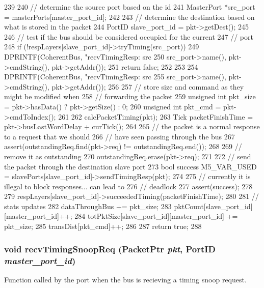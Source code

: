 \begin{DoxyCode}
239 {
240     // determine the source port based on the id
241     MasterPort *src_port = masterPorts[master_port_id];
242 
243     // determine the destination based on what is stored in the packet
244     PortID slave_port_id = pkt->getDest();
245 
246     // test if the bus should be considered occupied for the current
247     // port
248     if (!respLayers[slave_port_id]->tryTiming(src_port)) {
249         DPRINTF(CoherentBus, "recvTimingResp: src %
250                 src_port->name(), pkt->cmdString(), pkt->getAddr());
251         return false;
252     }
253 
254     DPRINTF(CoherentBus, "recvTimingResp: src %
255             src_port->name(), pkt->cmdString(), pkt->getAddr());
256 
257     // store size and command as they might be modified when
258     // forwarding the packet
259     unsigned int pkt_size = pkt->hasData() ? pkt->getSize() : 0;
260     unsigned int pkt_cmd = pkt->cmdToIndex();
261 
262     calcPacketTiming(pkt);
263     Tick packetFinishTime = pkt->busLastWordDelay + curTick();
264 
265     // the packet is a normal response to a request that we should
266     // have seen passing through the bus
267     assert(outstandingReq.find(pkt->req) != outstandingReq.end());
268 
269     // remove it as outstanding
270     outstandingReq.erase(pkt->req);
271 
272     // send the packet through the destination slave port
273     bool success M5_VAR_USED = slavePorts[slave_port_id]->sendTimingResp(pkt);
274 
275     // currently it is illegal to block responses... can lead to
276     // deadlock
277     assert(success);
278 
279     respLayers[slave_port_id]->succeededTiming(packetFinishTime);
280 
281     // stats updates
282     dataThroughBus += pkt_size;
283     pktCount[slave_port_id][master_port_id]++;
284     totPktSize[slave_port_id][master_port_id] += pkt_size;
285     transDist[pkt_cmd]++;
286 
287     return true;
288 }
\end{DoxyCode}
\hypertarget{classCoherentBus_a8a06090652319e21031b8bc2f8018e2b}{
\subsubsection[{recvTimingSnoopReq}]{\setlength{\rightskip}{0pt plus 5cm}void recvTimingSnoopReq ({\bf PacketPtr} {\em pkt}, \/  {\bf PortID} {\em master\_\-port\_\-id})}}
\label{classCoherentBus_a8a06090652319e21031b8bc2f8018e2b}
Function called by the port when the bus is recieving a timing snoop request. 


